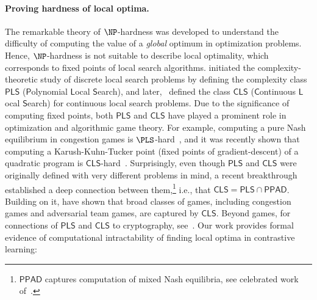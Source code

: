 \documentclass{article}
\theoremstyle{definition}  %
\theoremstyle{plain}
\numberwithin{observation}{section}
\numberwithin{claim}{section}
\numberwithin{fact}{section}
\numberwithin{lemma}{section}
\numberwithin{proposition}{section}
\numberwithin{theorem}{section}
\numberwithin{corollary}{section}
\numberwithin{definition}{section}
\newcommand{\CLS}{\mathsf{CLS}}
\theoremstyle{plain}
\begin{document}
\vspace{-0.2cm}
\paragraph{Proving hardness of local optima.} The remarkable theory of $\NP$-hardness was developed to understand the difficulty of computing the value of a \textit{global} optimum in optimization problems. Hence, $\NP$-hardness is not suitable to describe local optimality, which corresponds to fixed points of local search algorithms. \citet*{johnson1988easy} initiated the complexity-theoretic study of discrete local search problems by defining the complexity class $\mathsf{PLS}$ ($\mathsf{P}$olynomial $\mathsf{L}$ocal $\mathsf{S}$earch), and later,~\citet{daskalakis2011continuous} defined the class $\mathsf{CLS}$ ($\mathsf{C}$ontinuous $\mathsf{L}$ocal $\mathsf{S}$earch) for continuous local search problems. Due to the significance of computing fixed points, both $\mathsf{PLS}$ and $\mathsf{CLS}$ have played a prominent role in optimization and algorithmic game theory. For example, computing a pure Nash equilibrium in congestion games is $\PLS$-hard~\citep{fabrikant2004complexity}, and it was recently shown that computing a Karush-Kuhn-Tucker point (fixed points of gradient-descent) of a quadratic program is $\CLS$-hard~\citep{fearnley2024complexity}. Surprisingly, even though $\mathsf{PLS}$ and $\mathsf{CLS}$ were originally defined with very different problems in mind, a recent breakthrough~\citep*{Fearnley23:Complexity} established a deep connection between them,\footnote{$\mathsf{PPAD}$ captures computation of mixed Nash equilibria, see celebrated work of~\cite{daskalakis2009complexity}.} i.e., that $\mathsf{CLS}=\mathsf{PLS}\cap\mathsf{PPAD}$. Building on it, \citet{Babichenko21:Settling,Anagnostides23:Algorithms,
ghosh2024complexitysymmetricbimatrixgames, anagnostides2025complexitysymmetricequilibriaminmax} have shown  that broad classes of games, including congestion games and adversarial team games, are captured by $\CLS$. Beyond games, for connections of $\mathsf{PLS}$ and $\mathsf{CLS}$ to cryptography, see~\citet{bitansky2020cryptographic,hubacek2020hardness}. Our work provides formal evidence of computational intractability of finding local optima in contrastive learning:
\end{document}
